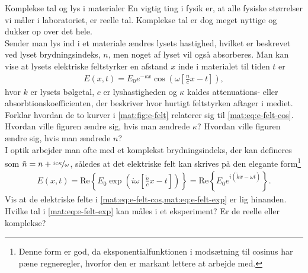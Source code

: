 \begin{opgave}[3]{Komplekse tal og lys i materialer}
En vigtig ting i fysik er, at alle fysiske størrelser vi måler i laboratoriet, er reelle  tal. Komplekse tal er dog meget nyttige og dukker op over det hele. \\
Sender man lys ind i et materiale ændres lysets hastighed, hvilket er beskrevet ved lyset brydningsindeks, $n$, men noget af lyset vil også absorberes. Man kan vise at lysets elektriske feltstyrker en afstand $x$ inde i materialet til tiden $t$ er 
%
\begin{align} \label{mat:eq:e-felt-cos}
    E(x,t) = E_0e^{-\kappa x}\cos\left(\omega\left[\frac{n}{c}x-t\right]\right),
\end{align}
%
hvor $k$ er lysets bølgetal, $c$ er lyshastigheden og $\kappa$ kaldes attenuations- eller absorbtionskoefficienten, der beskriver hvor hurtigt feltstyrken aftager i mediet.
\opg Forklar hvordan de to kurver i \cref{mat:fig:e-felt} relaterer sig til \cref{mat:eq:e-felt-cos}.
\opg Hvordan ville figuren ændre sig, hvis man ændrede $\kappa$?
\opg Hvordan ville figuren ændre sig, hvis man ændrede $n$? \\[2mm]
I optik arbejder man ofte med et komplekst brydningsindeks, der kan defineres som $\tilde{n} = n + \nicefrac{ic\kappa}{\omega}$, således at det elektriske felt kan skrives på den elegante form\footnote{Denne form er god, da eksponentialfunktionen i modsætning til cosinus har pæne regneregler, hvorfor den er markant lettere at arbejde med.}
%
\begin{align} \label{mat:eq:e-felt-exp}
    E(x,t) = \text{Re}\left\{E_0\exp\left(i\omega\left[\frac{\tilde{n}}{c}x - t\right]\right)\right\} = \text{Re}\left\{E_0e^{i\left(\tilde{k}x - \omega t\right)}\right\}.
\end{align}
\opg Vis at de elektriske felte i \cref{mat:eq:e-felt-cos,mat:eq:e-felt-exp} er lig hinanden.
\opg Hvilke tal i \cref{mat:eq:e-felt-exp} kan måles i et eksperiment? Er de reelle eller komplekse?
\end{opgave}